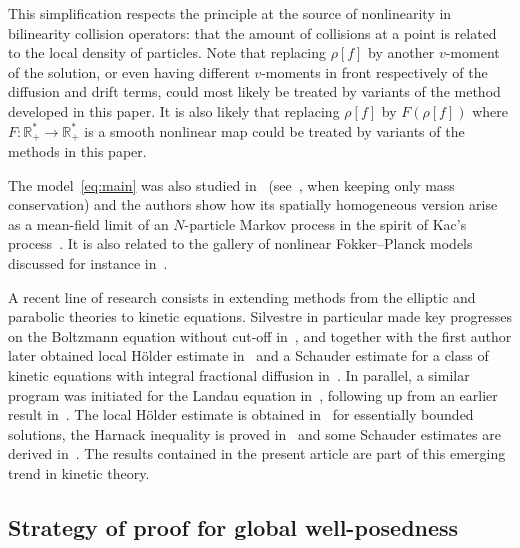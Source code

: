 \documentclass[10pt]{amsart}
\theoremstyle{definition}\newtheorem{defi}[theo]{Definition}\newtheorem{rema}[theo]{Remark}\newtheorem{exam}[theo]{Example}\newtheorem{exem}[theo]{Example}\newtheorem{nota}[theo]{Notation}
\newcommand{\R}{\mathbb{R}}
\newcommand*{\MK}{\mkern 2mu}
\begin{document}
This simplification respects the principle at the source of nonlinearity in bilinearity collision operators: that the amount of collisions at a point is related to the local density of particles. Note that replacing $\rho[f]$ by another $v$-moment of the solution, or even having different $v$-moments in front respectively of the diffusion and drift terms, could most likely be treated by variants of the method developed in this paper. It is also likely that replacing $\rho[f]$ by $F(\rho[f])$ where $F:\R_+^* \to \R_+^*$ is a smooth nonlinear map could be treated by variants of the methods in this paper.

The model~\eqref{eq:main} was also studied in~\cite{MR2252155} (see~\cite[equation$\MK$(9)]{MR2252155}, when keeping only mass conservation) and the authors show how its spatially homogeneous version arise as a mean-field limit of an $N$-particle Markov process in the spirit of Kac's process~\cite{MR0084985}. It is also related to the gallery of nonlinear Fokker--Planck models discussed for instance in~\cite{chavanis2008nonlinear}.

A recent line of research consists in extending methods from the elliptic and parabolic theories to kinetic equations. Silvestre in particular made key progresses on the Boltzmann equation without cut-off in~\cite{MR3551261}, and together with the first author later obtained local H\"older estimate in~\cite{is} and a Schauder estimate for a class of kinetic equations with integral fractional diffusion in~\cite{imbert2018schauder}. In parallel, a similar program was initiated for the Landau equation in~\cite{gimv}, following up from an earlier result in~\cite{wz09}. The local H\"older estimate is obtained in~\cite{gimv,wz09} for essentially bounded solutions, the Harnack inequality is proved in~\cite{gimv} and some Schauder estimates are derived in~\cite{hs}. The results contained in the present article are part of this emerging trend in kinetic theory.

\subsection{Strategy of proof for global well-posedness}
\end{document}
